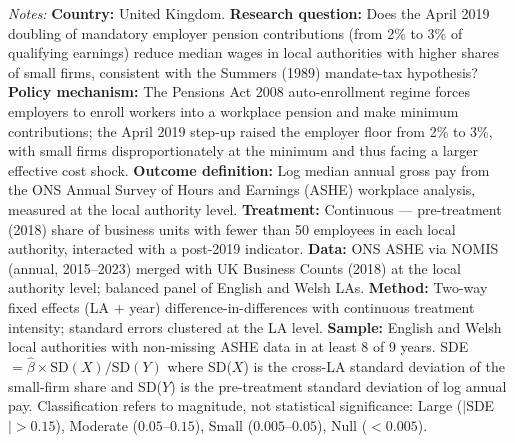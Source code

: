 \begin{table}[t]
{\footnotesize \textit{Notes:} \textbf{Country:} United Kingdom. \textbf{Research question:} Does the April 2019 doubling of mandatory employer pension contributions (from 2\% to 3\% of qualifying earnings) reduce median wages in local authorities with higher shares of small firms, consistent with the Summers (1989) mandate-tax hypothesis? \textbf{Policy mechanism:} The Pensions Act 2008 auto-enrollment regime forces employers to enroll workers into a workplace pension and make minimum contributions; the April 2019 step-up raised the employer floor from 2\% to 3\%, with small firms disproportionately at the minimum and thus facing a larger effective cost shock. \textbf{Outcome definition:} Log median annual gross pay from the ONS Annual Survey of Hours and Earnings (ASHE) workplace analysis, measured at the local authority level. \textbf{Treatment:} Continuous --- pre-treatment (2018) share of business units with fewer than 50 employees in each local authority, interacted with a post-2019 indicator. \textbf{Data:} ONS ASHE via NOMIS (annual, 2015--2023) merged with UK Business Counts (2018) at the local authority level; balanced panel of English and Welsh LAs. \textbf{Method:} Two-way fixed effects (LA + year) difference-in-differences with continuous treatment intensity; standard errors clustered at the LA level. \textbf{Sample:} English and Welsh local authorities with non-missing ASHE data in at least 8 of 9 years. SDE $= \hat{\beta} \times \text{SD}(X) / \text{SD}(Y)$ where SD($X$) is the cross-LA standard deviation of the small-firm share and SD($Y$) is the pre-treatment standard deviation of log annual pay. Classification refers to magnitude, not statistical significance: Large ($|$SDE$| > 0.15$), Moderate ($0.05$--$0.15$), Small ($0.005$--$0.05$), Null ($< 0.005$).
}
\end{table}
